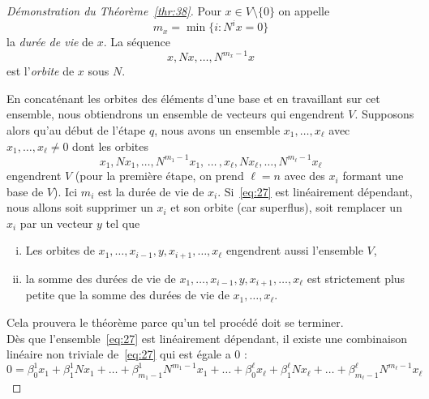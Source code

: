 \begin{proof}[Démonstration du Théorème~\ref{thr:38}] 
  Pour $x \in V \setminus \{0\}$ on appelle 
  \begin{displaymath}
    m_x = \min \{ i \colon N^ix = 0\}
  \end{displaymath}
  la \emph{durée de vie} de $x$. 
  La séquence 
  \begin{displaymath}
    x, Nx, \dots, N^{m_x-1} x
  \end{displaymath}
  est l'\emph{orbite} de $x$ sous $N$. 
  
  En concaténant les orbites des éléments d'une base et en travaillant sur cet ensemble, nous obtiendrons un ensemble de vecteurs qui engendrent $V$. 
  Supposons alors qu'au début de l'étape $q$, nous avons un ensemble $x_1,\dots,x_\ell$ avec $x_1,\dots,x_\ell \neq0$  dont les orbites 
  \begin{equation}
    \label{eq:27}
    x_1,Nx_1,\dots,N^{m_1-1}x_1, \,\dots \, ,  x_\ell,Nx_\ell,\dots,N^{m_\ell-1}x_\ell
  \end{equation}
  engendrent $V$ (pour la première étape, on prend $\ell = n$ avec des $x_i$ formant une base de $V$). Ici $m_i$ est la durée de vie de $x_i$. Si~\eqref{eq:27} est linéairement dépendant, nous allons soit supprimer un $x_i$ et son orbite (car superflus), soit remplacer un $x_i$ par un vecteur $y$ tel que 
  \begin{enumerate}[i)]
  \item Les orbites de $x_1,\dots, x_{i-1},y,x_{i+1},\dots,x_{\ell}$ engendrent aussi l'ensemble  $V$, 
  \item la somme des durées de vie de $x_1,\dots, x_{i-1},y,x_{i+1},\dots,x_{\ell}$  est strictement plus petite que la somme des durées de vie de $x_1,\dots,x_{\ell}$. 
  \end{enumerate}
Cela prouvera le théorème parce qu'un tel procédé doit se terminer. \\

Dès que l'ensemble~\eqref{eq:27} est linéairement dépendant, il existe une combinaison linéaire non triviale de~\eqref{eq:27} qui est égale a $0$ :
\begin{displaymath}
0 =   β_0^1 x_1 + β_1^1 Nx_1+ \dots+ β_{m_1-1}^1 N^{m_1-1}x_1 + \dots + 
β_0^\ell x_\ell + β_1^\ell Nx_\ell+ \dots+ β_{m_\ell-1}^\ell N^{m_\ell-1}x_\ell 
\end{displaymath}


\end{proof}
